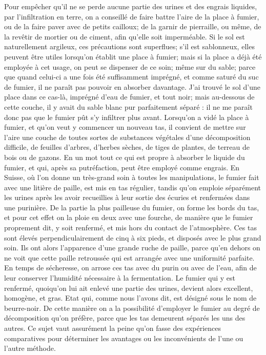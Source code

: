 Pour empêcher qu'il ne se perde aucune\setcounter{page}{307} partie des urines et des engrais liquides, par l'infiltration en terre, on a conseillé de faire battre l'aire de la place à fumier, ou de la faire paver avec de petits cailloux; de la garnir de pierraille, ou même, de la revêtir de mortier ou de ciment, afin qu'elle soit imperméable. Si le sol est naturellement argileux, ces précautions sont superflues; s'il est sablonneux, elles peuvent être utiles lorsqu'on établit une place à fumier; mais si la place a déjà été employée à cet usage, on peut se dispenser de ce soin; même sur du sable; parce que quand celui-ci a une fois été suffisamment imprégné, et comme saturé du suc de fumier, il ne paraît pas pouvoir en absorber davantage. J'ai trouvé le sol d'une place dans ce cas-là, imprégné d'eau de fumier, et tout noir; mais au-dessous de cette couche, il y avait du sable blanc pur parfaitement séparé : il ne me paraît donc pas que le fumier pût s'y infiltrer plus avant. Lorsqu'on a vidé la place à fumier, et qu'on veut y commencer un nouveau tas, il convient de mettre sur l'aire une couche de toutes sortes de substances végétales d'une décomposition difficile, de feuilles d'arbres, d'herbes sèches, de tiges de plantes, de terreau de bois ou de gazons. En un mot tout\setcounter{page}{308} ce qui est propre à absorber le liquide du fumier, et qui, après sa putréfaction, peut être employé comme engrais. En Suisse, où l'on donne un très-grand soin à toutes les manipulations, le fumier fait avec une litière de paille, est mis en tas régulier, tandis qu'on emploie séparément les urines après les avoir recueillies à leur sortie des écuries et renfermées dans une purinière. De la partie la plus pailleuse du fumier, on forme les bords du tas, et pour cet effet on la ploie en deux avec une fourche, de manière que le fumier proprement dit, y soit renfermé, et mis hors du contact de l'atmosphère. Ces tas sont élevés perpendiculairement de cinq à six pieds, et disposés avec le plus grand soin. Ils ont alors l'apparence d'une grande ruche de paille, parce qu'en dehors on ne voit que cette paille retroussée qui est arrangée avec une uniformité parfaite. En temps de sécheresse, on arrose ces tas avec du purin ou avec de l'eau, afin de leur conserver l'humidité nécessaire à la fermentation. Le fumier qui y est renfermé, quoiqu'on lui ait enlevé une partie des urines, devient alors excellent, homogène, et gras. Etat qui, comme nous l'avons dit, est désigné sous le nom de beurre-noir. De cette manière on a la possibilité d'employer le fumier au\setcounter{page}{309} degré de décomposition qu'on préfère, parce que les tas demeurent séparés les uns des autres. Ce sujet vaut assurément la peine qu'on fasse des expériences comparatives pour déterminer les avantages ou les inconvénients de l'une ou l'autre méthode.
